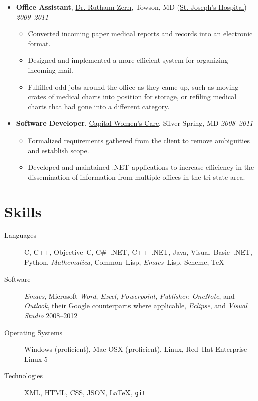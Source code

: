 \documentclass[11pt,letterpaper]{article}
\makeatletter
\newcommand{\position}[5]{\item%
  \begin{tabular*}{1.0\linewidth}{l@{\extracolsep{\fill}}r}
    #1 & #2\\
    \textit{#3} & \textit{#4---#5}
  \end{tabular*}}
\renewcommand{\position}[6][]{%
\item[#1] \hspace*{-2em}\textbf{#4}, #2, #3\hfill
  \textit{#5--#6}\vspace*{-.8em}}
\newcommand{\cwc}{\href{http://www.cwcare.net}{Capital Women's Care}}
\newcommand{\software}[1]{\textsl{#1}}
\makeatother
\begin{document}
\begin{itemize}
\position {\href{http://www.cwcare.net/Provider.aspx?pid=1269}
                {Dr. Ruthann Zern}}
          {Towson, MD (\href{http://www.stjosephtowson.com/}
                            {St. Joseph's Hospital})}
          {Office Assistant}
          {2009}{2011}
          \begin{itemize}
          \item Converted incoming paper medical reports and records
            into an electronic format.
          \item Designed and implemented a more efficient system for
            organizing incoming mail.
          \item Fulfilled odd jobs around the office as they came up,
            such as moving crates of medical charts into position for
            storage, or refiling medical charts that had gone into a
            different category.
          \end{itemize}

\position {\cwc}
          {Silver Spring, MD}
          {Software Developer}
          {2008}{2011}
          \begin{itemize}
          \item Formalized requirements gathered from the client to
            remove ambiguities and establish scope.
          \item Developed and maintained .NET applications to increase
            efficiency in the dissemination of information from
            multiple offices in the tri-state area.
          \end{itemize}
\end{itemize}

\section*{Skills}
  \begin{description}
  \item[Languages] C, C++, Objective~C, C\#~.NET, C++~.NET, Java,
    Visual~Basic~.NET, Python, \software{Mathematica}, Common~Lisp,
    \software{Emacs}~Lisp, Scheme, \TeX

  \item[Software] \software{Emacs}, Microsoft
    \software{Word}, \software{Excel}, \software{Powerpoint},
    \software{Publisher}, \software{OneNote}, and \software{Outlook},
    their Google counterparts where applicable, \software{Eclipse},
    and \software{Visual Studio} 2008--2012

  \item[Operating Systems] Windows (proficient), Mac OSX (proficient),
    Linux, Red~Hat Enterprise Linux 5

  \item[Technologies] XML, HTML, CSS, JSON, \LaTeX{}, \texttt{git}
  \end{description}
\end{document}
